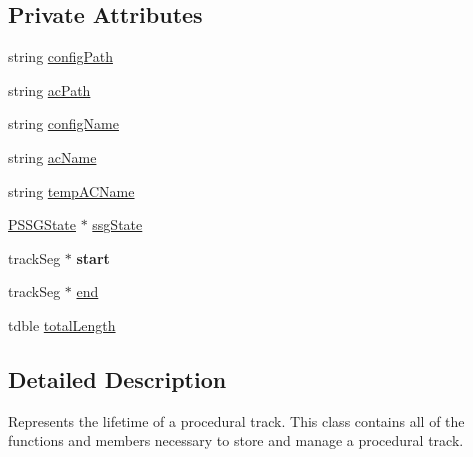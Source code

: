 \subsection*{Private Attributes}
\begin{DoxyCompactItemize}
\item 
string \hyperlink{classprocedural_1_1_p_track_a1b5bfa2efcabace6e87dd8e8c482639a}{config\-Path}
\item 
string \hyperlink{classprocedural_1_1_p_track_ae9e88a321deabda8a92688e364e23513}{ac\-Path}
\item 
string \hyperlink{classprocedural_1_1_p_track_a9ea72d121db71e2a284375a381ddb310}{config\-Name}
\item 
string \hyperlink{classprocedural_1_1_p_track_a7fc4bf8b022038141cf4f50755bcb14d}{ac\-Name}
\item 
string \hyperlink{classprocedural_1_1_p_track_a94cc721755160a6ba8ff51471507616c}{temp\-A\-C\-Name}
\item 
\hyperlink{classprocedural_1_1_p_s_s_g_state}{P\-S\-S\-G\-State} $\ast$ \hyperlink{classprocedural_1_1_p_track_ab3612b80647c9900fc41b26a89d486a1}{ssg\-State}
\item 
\hypertarget{classprocedural_1_1_p_track_a86251d6319ae2a2fc3817d67e617f1e7}{track\-Seg $\ast$ {\bfseries start}}\label{classprocedural_1_1_p_track_a86251d6319ae2a2fc3817d67e617f1e7}

\item 
track\-Seg $\ast$ \hyperlink{classprocedural_1_1_p_track_ac9001885365980b067a13749419416e6}{end}
\item 
tdble \hyperlink{classprocedural_1_1_p_track_a5b2eda49220f8825f55624faf62aa106}{total\-Length}
\end{DoxyCompactItemize}


\subsection{Detailed Description}
Represents the lifetime of a procedural track. This class contains all of the functions and members necessary to store and manage a procedural track. 

